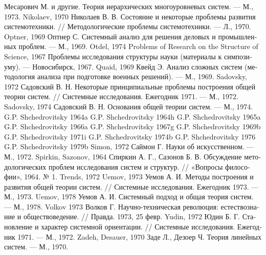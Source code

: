 \documentclass[11pt,a4paper]{article}
\begin{document}
\begin{thebibliography}{xxx}
  \foreignlanguage{russian}{Месарович М. и другие. Теория иерархических
    многоуровневых систем. — М., 1973. }
 Nikolaev, 1970 \foreignlanguage{russian}{Николаев
  В. В. Состояние и некоторые проблемы развития системотехники. //
  Методологические проблемы системотехники. — Л., 1970.  }
 Optner, 1969 \foreignlanguage{russian}{Оптнер
  С. Системный анализ для решения деловых и промышленных проблем. — М., 1969.
}
 Otdel, 1974
 Problems of Research on the Structure of Science, 1967
  \foreignlanguage{russian}{Проблемы исследования структуры науки (материалы к
    симпозиуму). — Новосибирск, 1967.}
 Quaid, 1969 \foreignlanguage{russian}{Квейд Э. Анализ
  сложных систем (методология анализа при подготовке военных решений). — М.,
  1969.}
 Sadovsky, 1972 \foreignlanguage{russian}{Садовский
  В. Н. Некоторые принципиальные проблемы построения общей теории систем. //
  Системные исследования. Ежегодник 1971. — М., 1972.  }
 Sadovsky, 1974 \foreignlanguage{russian}{Садовский
  В. Н. Основания общей теории систем. — М., 1974.  }
 G.P. Shchedrovitsky 1964a
 G.P. Shchedrovitsky 1964h
 G.P. Shchedrovitsky 1965a
 G.P. Shchedrovitsky 1966a
 G.P. Shchedrovitsky 1967g
 G.P. Shchedrovitsky 1969b
 G.P. Shchedrovitsky 1971i
 G.P. Shchedrovitsky 1974b
 G.P. Shchedrovitsky 1976
 G.P. Shchedrovitsky 1979b
 Simon, 1972 \foreignlanguage{russian}{Саймон Г. Науки об
  искусственном. — М., 1972.}
 Spirkin, Sazonov, 1964 \foreignlanguage{russian}{Спиркин
  А. Г., Сазонов Б. В. Обсуждение методологических проблем исследования систем
  и структур. // «Вопросы философии», 1964. № 1.}
 Trends, 1972
 Uemov, 1973 \foreignlanguage{russian}{Уемов А. И. Методы
  построения и развития общей теории систем. // Системные
  исследования. Ежегодник 1973. — М., 1973.  }
 Uemov, 1978 \foreignlanguage{russian}{Уемов
  А. И. Системный подход и общая теория систем. — М., 1978.}
 Volkov 1973 \foreignlanguage{russian}{Волков
  Г. Научно-техническая революция: естествознание и обществоведение. //
  Правда. 1973, 25 февр.}
 Yudin, 1972 \foreignlanguage{russian}{Юдин
  Б. Г. Становление и характер системной ориентации. // Системные
  исследования. Ежегодник 1971. — М., 1972.}
 Zadeh, Desauer, 1970 \foreignlanguage{russian}{Заде Л.,
  Дезоер Ч. Теория линейных систем. — М., 1970.  }
\end{thebibliography}
\end{document}
